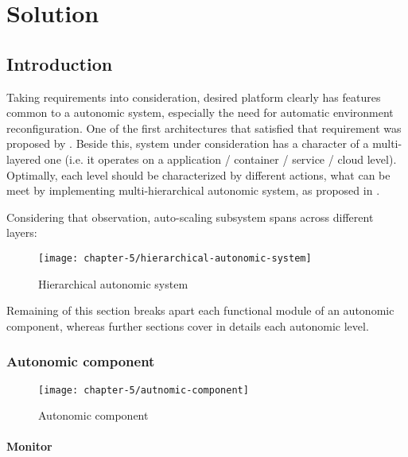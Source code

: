 \chapter{Solution}

\section{Introduction}

Taking requirements into consideration, desired platform clearly has features common to a autonomic system, especially the need for automatic environment reconfiguration. One of the first architectures that satisfied that requirement was proposed by \cite{IBM06}. Beside this, system under consideration has a character of a multi-layered one (i.e. it operates on a application / container / service / cloud level). Optimally, each level should be characterized by different actions, what can be meet by implementing multi-hierarchical autonomic system, as proposed in \cite{LiWoZh05}.

Considering that observation, auto-scaling subsystem spans across different layers:

\begin{figure}[!ht]
  \begin{center}
    \texttt{[image: chapter-5/hierarchical-autonomic-system]}
  \end{center}
  \caption{Hierarchical autonomic system}
  \label{ch5:hierarchical-autonomic-system}
\end{figure}

Remaining of this section breaks apart each functional module of an autonomic component, whereas further sections cover in details each autonomic level.

\subsection{Autonomic component}

\begin{figure}[!ht]
  \begin{center}
    \texttt{[image: chapter-5/autnomic-component]}
  \end{center}
  \caption{Autonomic component}
  \label{ch5:autonomic-component}
\end{figure}

\subsubsection{Monitor}

